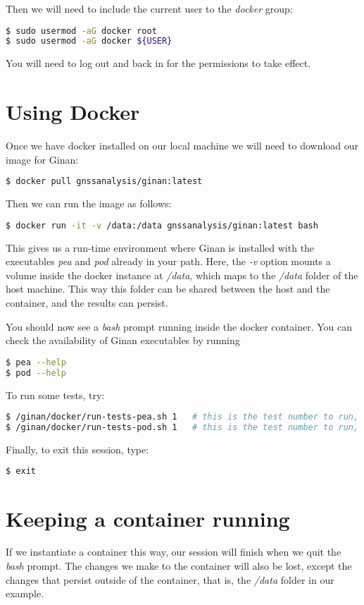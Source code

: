 Then we will need to include the current user to the \emph{docker} group:
\begin{lstlisting}[language=bash]
$ sudo usermod -aG docker root
$ sudo usermod -aG docker ${USER}
\end{lstlisting}
You will need to log out and back in for the permissions to take effect.

\section{Using Docker}

Once we have docker installed on our local machine we will need to download our image for Ginan:
\begin{lstlisting}[language=bash]
$ docker pull gnssanalysis/ginan:latest
\end{lstlisting}
Then we can run the image as follows:
\begin{lstlisting}[language=bash]
$ docker run -it -v /data:/data gnssanalysis/ginan:latest bash
\end{lstlisting}
This gives us a run-time environment where Ginan is installed with the executables
\emph{pea} and \emph{pod} already in your path.
Here, the \emph{-v} option mounts a volume inside the docker instance at \emph{/data},
which maps to the \emph{/data} folder of the host machine. This way this folder
can be shared between the host and the container, and the results can persist.

You should now see a \emph{bash} prompt running inside the docker container.
You can check the availability of Ginan executables by running
\begin{lstlisting}[language=bash]
$ pea --help
$ pod --help
\end{lstlisting}

To run some tests, try:
\begin{lstlisting}[language=bash]
$ /ginan/docker/run-tests-pea.sh 1   # this is the test number to run, from 1 to 8 currently
$ /ginan/docker/run-tests-pod.sh 1   # this is the test number to run, from 1 to 6 currently
\end{lstlisting}

Finally, to exit this session, type:
\begin{lstlisting}[language=bash]
$ exit
\end{lstlisting}


\section{Keeping a container running}
If we instantiate a container this way, our session will finish when we quit the \emph{bash} prompt.
The changes we make to the container will also be lost, except the changes that persist outside
of the container, that is, the \emph{/data} folder in our example.

